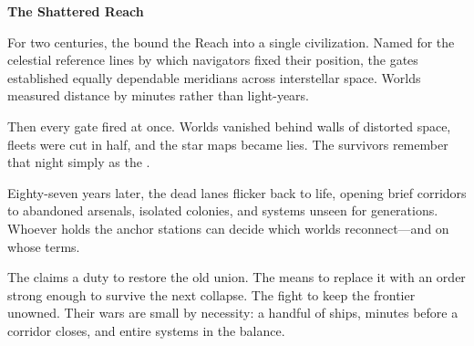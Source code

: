 {}
{\sffamily\Huge\bfseries\color{reachvoid}The Shattered Reach\par}\medskip

For two centuries, the  bound the Reach into a single civilization. Named for the celestial reference lines by which navigators fixed their position, the gates established equally dependable meridians across interstellar space. Worlds measured distance by minutes rather than light-years.

Then every gate fired at once. Worlds vanished behind walls of distorted space, fleets were cut in half, and the star maps became lies. The survivors remember that night simply as the .

Eighty-seven years later, the dead lanes flicker back to life, opening brief corridors to abandoned arsenals, isolated colonies, and systems unseen for generations. Whoever holds the anchor stations can decide which worlds reconnect---and on whose terms.

The  claims a duty to restore the old union. The  means to replace it with an order strong enough to survive the next collapse. The  fight to keep the frontier unowned. Their wars are small by necessity: a handful of ships, minutes before a corridor closes, and entire systems in the balance.

